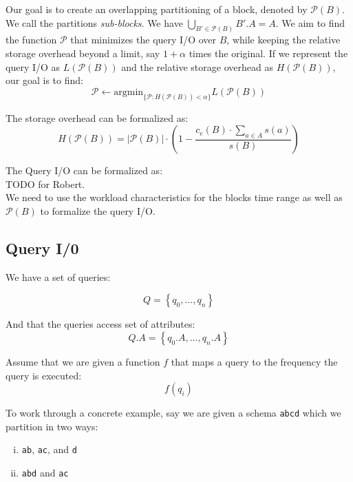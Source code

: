 \documentclass{sig-alternate}
\begin{document}
Our goal is to create an overlapping partitioning of a block, denoted by
$\mathcal{P}(B)$. We call the partitions \emph{sub-blocks}. We have
$\bigcup_{B'\in \mathcal{P}(B)} B'.A = A$. We aim to find the function
$\mathcal{P}$ that minimizes the query I/O over $B$, while keeping the
relative storage overhead beyond a limit, say $1+\alpha$ times the original.
If we represent the query I/O as $L(\mathcal{P}(B))$ and the relative storage
overhead as $H(\mathcal{P}(B))$, our goal is to find:
\begin{equation}
\mathcal{P} \leftarrow \mbox{argmin}_{\{\mathcal{P}: H(\mathcal{P}(B)) < \alpha\}} L(\mathcal{P}(B))
\end{equation}

The storage overhead can be formalized as:
\begin{equation}
H(\mathcal{P}(B)) = |\mathcal{P}(B)|\cdot\left(1-\frac{c_e(B)\cdot \sum_{a\in A} s(a)}{s(B)}\right) 
\end{equation}

The Query I/O can be formalized as:\\
TODO for Robert.\\
We need to use the workload characteristics for the blocks time range as
well as $\mathcal{P}(B)$ to formalize the query I/O.\\

\subsection{Query I/0}

\noindent 
We have a set of queries:

$$
Q = \left\{ q_0, \dots,  q_n \right\}
$$

\noindent 
And that the queries access set of attributes:
$$
Q.A = \left\{ q_0.A, \dots,  q_n.A \right\}
$$

\noindent 
Assume that we are given a function $f$ that maps a query to the frequency the
query is executed:
$$
f(q_i)
$$

To work through a concrete example, say we are given a schema \texttt{abcd}
which we partition in two ways:
\begin{enumerate}[(i)]
\item \texttt{ab}, \texttt{ac}, and \texttt{d} 
\item \texttt{abd} and \texttt{ac} 
\end{enumerate}
\end{document}
